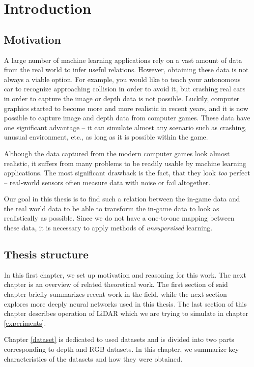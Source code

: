 \chapter{Introduction}

\section{Motivation}

A large number of machine learning applications rely on a vast amount of data from the real world to infer useful relations. However, obtaining these data is not always a viable option. For example, you would like to teach your autonomous car to recognize approaching collision in order to avoid it, but crashing real cars in order to capture the image or depth data is not possible. Luckily, computer graphics started to become more and more realistic in recent years, and it is now possible to capture image and depth data from computer games. These data have one significant advantage -- it can simulate almost any scenario such as crashing, unusual environment, etc., as long as it is possible within the game.

Although the data captured from the modern computer games look almost realistic, it suffers from many problems to be readily usable by machine learning applications. The most significant drawback is the fact, that they look {\em too} perfect -- real-world sensors often measure data with noise or fail altogether.

Our goal in this thesis is to find such a relation between the in-game data and the real world data to be able to transform the in-game data to look as realistically as possible. Since we do not have a one-to-one mapping between these data, it is necessary to apply methods of {\em unsupervised} learning.

\section{Thesis structure}
In this first chapter, we set up motivation and reasoning for this work. The next chapter is an overview of related theoretical work. The first section of said chapter briefly summarizes recent work in the field, while the next section explores more deeply neural networks used in this thesis. The last section of this chapter describes operation of LiDAR which we are trying to simulate in chapter \ref{experiments}.

Chapter \ref{dataset} is dedicated to used datasets and is divided into two parts corresponding to depth and RGB datasets. In this chapter, we summarize key characteristics of the datasets and how they were obtained.

